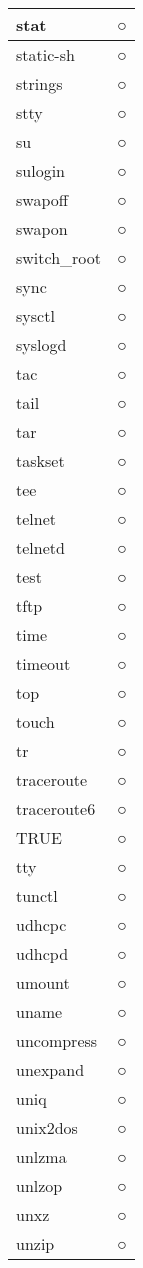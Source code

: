\begin{longtable}{p{40mm}p{40mm}}
stat &  ○ \\ \hline
static-sh & ○ \\ \hline
strings & ○ \\ \hline
stty &  ○ \\ \hline
su &  ○ \\ \hline
sulogin & ○ \\ \hline
swapoff & ○ \\ \hline
swapon &  ○ \\ \hline
switch_root & ○ \\ \hline
sync &  ○ \\ \hline
sysctl &  ○ \\ \hline
syslogd & ○ \\ \hline
tac & ○ \\ \hline
tail &  ○ \\ \hline
tar & ○ \\ \hline
taskset & ○ \\ \hline
tee & ○ \\ \hline
telnet &  ○ \\ \hline
telnetd & ○ \\ \hline
test &  ○ \\ \hline
tftp &  ○ \\ \hline
time &  ○ \\ \hline
timeout & ○ \\ \hline
top & ○ \\ \hline
touch & ○ \\ \hline
tr &  ○ \\ \hline
traceroute &  ○ \\ \hline
traceroute6 & ○ \\ \hline
TRUE &  ○ \\ \hline
tty & ○ \\ \hline
tunctl &  ○ \\ \hline
udhcpc &  ○ \\ \hline
udhcpd &  ○ \\ \hline
umount &  ○ \\ \hline
uname & ○ \\ \hline
uncompress &  ○ \\ \hline
unexpand &  ○ \\ \hline
uniq &  ○ \\ \hline
unix2dos &  ○ \\ \hline
unlzma &  ○ \\ \hline
unlzop &  ○ \\ \hline
unxz &  ○ \\ \hline
unzip & ○ \\ \hline

\end{longtable}
